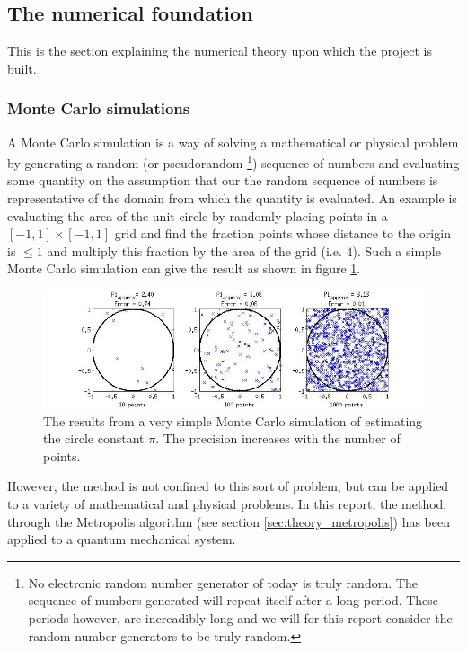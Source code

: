 \subsection{The numerical foundation}
This is the section explaining the numerical theory upon which the project is built. 

\subsubsection{Monte Carlo simulations}
A Monte Carlo simulation is a way of solving a mathematical or physical problem by generating a random
(or pseudorandom
\footnote
{No electronic random number generator of today is truly random. 
The sequence of numbers generated will repeat itself after a long period. 
These periods however, are increadibly long and we will for this report 
consider the random number generators to be truly random.})
sequence of numbers and evaluating some quantity on the assumption that our the random sequence of numbers is representative of the domain from which the quantity is evaluated.
An example is evaluating the area of the unit circle by randomly placing points in a $[-1,1] \times [-1,1] $ grid and find the fraction points whose distance to the origin is $\leq 1$ and multiply this fraction by the area of the grid (i.e. $4$).
Such a simple Monte Carlo simulation can give the result as shown in figure \ref{fig:Monte_Carlo_Illustration}.

\begin{figure}[h!]
        \centering 
        \includegraphics[width=\textwidth]{Monte_Carlo_Illustration.jpg}
        \caption{The results from a very simple Monte Carlo simulation of 
        estimating the circle constant $\pi$. 
        The precision increases with the number of points.}
        \label{fig:Monte_Carlo_Illustration}
\end{figure}

However, the method is not confined to this sort of problem, but can be applied to a variety of mathematical and physical problems. 
In this report, the method, through the Metropolis algorithm (see section \ref{sec:theory_metropolis}) has been applied to a quantum mechanical system.


